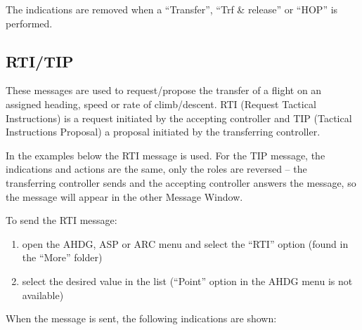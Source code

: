 \documentclass[a4paper,oneside,11pt]{memoir}
\begin{document}
The indications are removed when a “Transfer”, “Trf \& release” or “HOP” is performed.


\subsection{RTI/TIP}
\label{coo:rti}\label{coo:tip}
These messages are used to request/propose the transfer of a flight on an assigned heading, speed or rate of climb/descent. RTI (Request Tactical Instructions) is a request initiated by the accepting controller and TIP (Tactical Instructions Proposal) a proposal initiated by the transferring controller.

\bigskip

In the examples below the RTI message is used. For the TIP message, the indications and actions are the same, only the roles are reversed – the transferring controller sends and the accepting controller answers the message, so the message will appear in the other Message Window.

To send the RTI message:

\begin{enumerate}
  \item open the AHDG, ASP or ARC menu and select the “RTI” option (found in the “More” folder) 
  \item select the desired value in the list (“Point” option in the AHDG menu is not available)
\end{enumerate}

When the message is sent, the following indications are shown:
\end{document}
